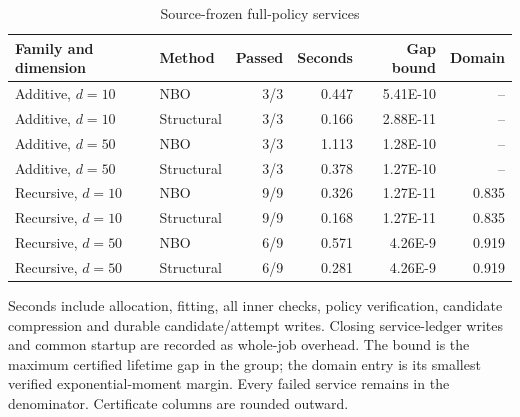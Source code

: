 \begin{table}[htbp]\centering\small
\caption{Source-frozen full-policy services}\label{tab:r27services}
\begin{tabular}{llrrrr}\toprule
Family and dimension & Method & Passed & Seconds & Gap bound & Domain \\ \midrule
Additive, $d=10$ & NBO & 3/3 & 0.447 & 5.41E-10 & -- \\
Additive, $d=10$ & Structural & 3/3 & 0.166 & 2.88E-11 & -- \\
Additive, $d=50$ & NBO & 3/3 & 1.113 & 1.28E-10 & -- \\
Additive, $d=50$ & Structural & 3/3 & 0.378 & 1.27E-10 & -- \\
Recursive, $d=10$ & NBO & 9/9 & 0.326 & 1.27E-11 & 0.835 \\
Recursive, $d=10$ & Structural & 9/9 & 0.168 & 1.27E-11 & 0.835 \\
Recursive, $d=50$ & NBO & 6/9 & 0.571 & 4.26E-9 & 0.919 \\
Recursive, $d=50$ & Structural & 6/9 & 0.281 & 4.26E-9 & 0.919 \\
\bottomrule\end{tabular}
\par\smallskip\parbox{0.97\linewidth}{\footnotesize Seconds include allocation, fitting, all inner checks, policy verification, candidate compression and durable candidate/attempt writes. Closing service-ledger writes and common startup are recorded as whole-job overhead. The bound is the maximum certified lifetime gap in the group; the domain entry is its smallest verified exponential-moment margin. Every failed service remains in the denominator. Certificate columns are rounded outward.}
\end{table}

